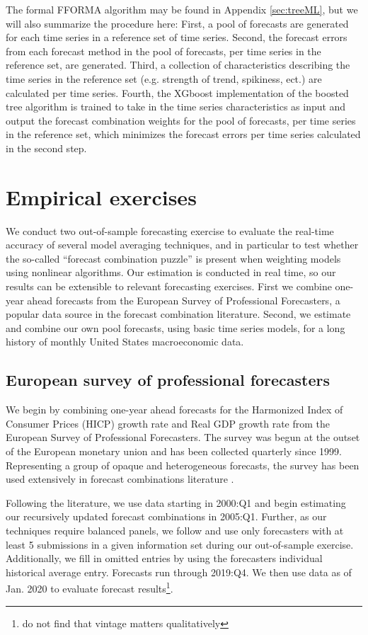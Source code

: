 \documentclass[12pt]{article}
\begin{document}
The formal FFORMA algorithm may be found in Appendix \ref{sec:treeML}, but we will also summarize the procedure here: First, a pool of forecasts are generated for each time series in a reference set of time series. Second, the forecast errors from each forecast method in the pool of forecasts, per time series in the reference set, are generated. Third, a collection of characteristics describing the time series in the reference set (e.g. strength of trend, spikiness, ect.) are calculated per time series. Fourth, the XGboost implementation of the boosted tree algorithm is trained to take in the time series characteristics as input and output the forecast combination weights for the pool of forecasts, per time series in the reference set, which minimizes the forecast errors per time series calculated in the second step.  

\section{Empirical exercises}
We conduct two out-of-sample forecasting exercise to evaluate the real-time accuracy of several model averaging techniques, and in particular to test whether the so-called ``forecast combination puzzle'' \citep[see][]{SW04JoForc} is present when weighting models using nonlinear algorithms. Our estimation is conducted in real time, so our results can be extensible to relevant forecasting exercises. First we combine one-year ahead forecasts from the European Survey of Professional Forecasters, a popular data source in the forecast combination literature. Second, we estimate and combine our own pool forecasts, using basic time series models, for a long history of monthly United States macroeconomic data. 

\subsection{European survey of professional forecasters}
We begin by combining one-year ahead forecasts for the Harmonized Index of Consumer Prices (HICP) growth rate and Real GDP growth rate from the European Survey of Professional Forecasters. The survey was begun at the outset of the European monetary union and has been collected quarterly since 1999. Representing a group of opaque and heterogeneous forecasts, the survey has been used extensively in forecast combinations literature \citep[see for example][]{GKMT2013, Conflitti2015, DieboldShin2019}. 

Following the literature, we use data starting in 2000:Q1 and begin estimating our recursively updated forecast combinations in 2005:Q1. Further, as our techniques require balanced panels, we follow \citet{Conflitti2015} and use only forecasters with at least 5 submissions in a given information set during our out-of-sample exercise. Additionally, we fill in omitted entries by using the forecasters individual historical average entry. Forecasts run through 2019:Q4. We then use data as of Jan. 2020 to evaluate forecast results\footnote{\cite{GKMT2013} do not find that vintage matters qualitatively}.
\end{document}
